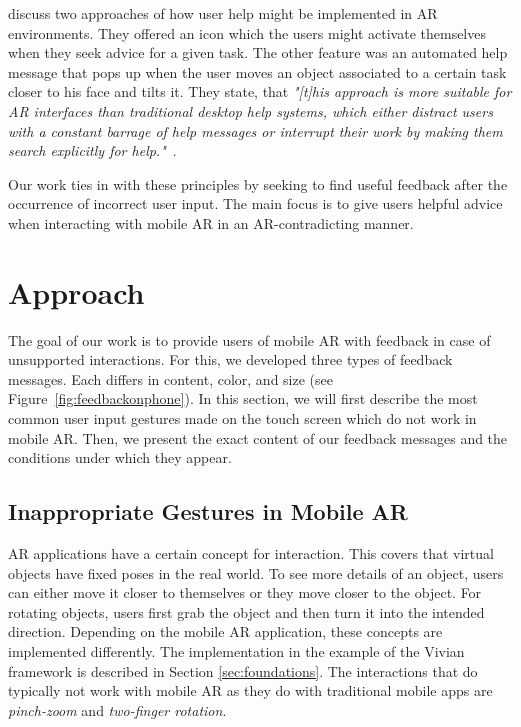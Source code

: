 \documentclass[manuscript]{acmart}
\begin{document}
		\citeauthor{Poupyrev2002} discuss two approaches of how user help might be implemented in \ac{AR} environments. They offered  an icon which the users might activate themselves when they seek advice for a given task. The other feature was an automated help message that pops up when the user moves an object associated to a certain task closer to his face and tilts it. They state, that \textit{"\textnormal{[t]}his approach is more suitable for AR interfaces than traditional desktop help systems, which either distract users with a constant barrage of help messages or interrupt their work by making them search explicitly for help."}~\cite{Poupyrev2002}.
		
		Our work ties in with these principles by seeking to find useful feedback after the occurrence of incorrect user input. The main focus is to give users helpful advice when interacting with mobile AR in an AR-contradicting manner.

	\section{Approach}\label{sec:approach}
		The goal of our work is to provide users of mobile \ac{AR} with feedback in case of unsupported interactions. For this, we developed three types of feedback messages. Each differs in content, color, and size (see Figure~\ref{fig:feedbackonphone}). In this section, we will first describe the most common user input gestures made on the touch screen which do not work in mobile \ac{AR}. Then, we present the exact content of our feedback messages and the conditions under which they appear.

		\subsection{Inappropriate Gestures in Mobile AR}\label{ssec:incorrectinput}
		\ac{AR} applications have a certain concept for interaction. This covers that virtual objects have fixed poses in the real world. To see more details of an object, users can either move it closer to themselves or they move closer to the object. For rotating objects, users first grab the object and then turn it into the intended direction.
		Depending on the mobile \ac{AR} application, these concepts are implemented differently. The implementation in the example of the Vivian framework is described in Section \ref{sec:foundations}. The interactions that do typically not work with mobile \ac{AR} as they do with traditional mobile apps are \emph{pinch-zoom} and \emph{two-finger rotation}.
\end{document}
